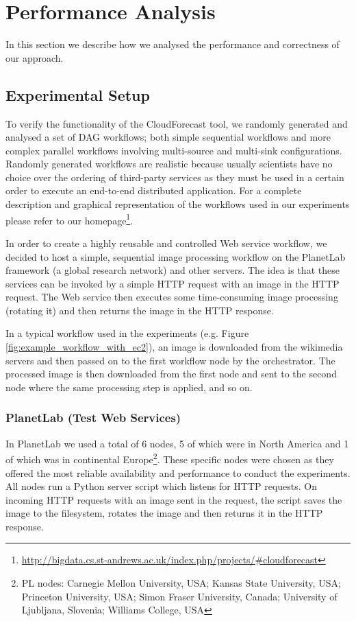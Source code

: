 \documentclass[10pt, conference, compsocconf]{IEEEtran}
\newcommand{\sysname}{CloudForecast\xspace}
\begin{document}
\section{Performance Analysis}
\label{sec:performanceanalysis}
In this section we describe how we analysed the performance and correctness of our approach.

\subsection{Experimental Setup}
To verify the functionality of the \sysname tool, we randomly generated and analysed a set of DAG workflows; both simple sequential workflows and more complex parallel workflows involving multi-source and multi-sink configurations. Randomly generated workflows are realistic because usually scientists have no choice over the ordering of third-party services as they must be used in a certain order to execute an end-to-end distributed application. For a complete description and graphical representation of the workflows used in our experiments please refer to our homepage\footnote{\url{http://bigdata.cs.st-andrews.ac.uk/index.php/projects/\#cloudforecast}}.

In order to create a highly reusable and controlled Web service workflow, we decided to host a simple, sequential image processing workflow on the PlanetLab \cite{planetlab} framework (a global research network) and other servers. The idea is that these services can be invoked by a simple HTTP request with an image in the HTTP request. The Web service then executes some time-consuming image processing (rotating it) and then returns the image in the HTTP response.

In a typical workflow used in the experiments (e.g. Figure \ref{fig:example_workflow_with_ec2}), an image is downloaded from the wikimedia servers and then passed on to the first workflow node by the orchestrator. The processed image is then downloaded from the first node and sent to the second node where the same processing step is applied, and so on.


\subsubsection{PlanetLab (Test Web Services)}

In PlanetLab we used a total of 6 nodes, 5 of which were in North America and 1 of which was in continental Europe\footnote{PL nodes: Carnegie Mellon University, USA; Kansas State University, USA; Princeton University, USA; Simon Fraser University, Canada; University of Ljubljana, Slovenia; Williams College, USA}. These specific nodes were chosen as they offered the most reliable availability and performance to conduct the experiments. All nodes run a Python server script which listens for HTTP requests. On incoming HTTP requests with an image sent in the request, the script saves the image to the filesystem, rotates the image and then returns it in the HTTP response.
\end{document}
